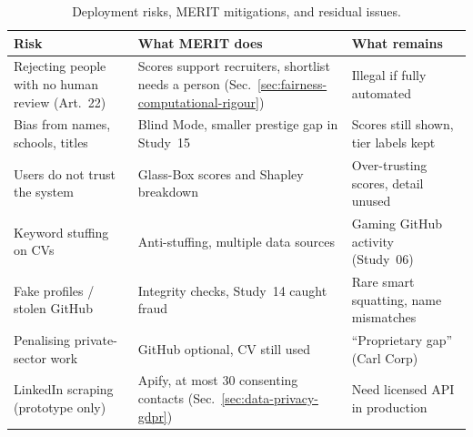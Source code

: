 \begin{table}[htbp]
    \centering
    \caption[Deployment risks and mitigations]{Deployment risks, MERIT mitigations, and residual issues.}
    \label{tab:ethics-deployment-summary}
    \merittablesize
    \begin{tabularx}{\textwidth}{@{}%
        >{\raggedright\arraybackslash\hsize=0.95\hsize}X
        >{\raggedright\arraybackslash\hsize=1.15\hsize}X
        >{\raggedright\arraybackslash\hsize=0.9\hsize}X @{}}
        \toprule
        \textbf{Risk} & \textbf{What MERIT does} &
            \textbf{What remains} \\
        \midrule
        Rejecting people with no human review (Art.~22) &
        Scores support recruiters, shortlist needs a person
            (Sec.~\ref{sec:fairness-computational-rigour}) &
        Illegal if fully automated \\
        Bias from names, schools, titles &
        Blind Mode, smaller prestige gap in Study~15 &
        Scores still shown, tier labels kept \\
        Users do not trust the system &
        Glass-Box scores and Shapley breakdown &
        Over-trusting scores, detail unused \\
        Keyword stuffing on CVs &
        Anti-stuffing, multiple data sources &
        Gaming GitHub activity (Study~06) \\
        Fake profiles / stolen GitHub &
        Integrity checks, Study~14 caught fraud &
        Rare smart squatting, name mismatches \\
        Penalising private-sector work &
        GitHub optional, CV still used &
        ``Proprietary gap'' (Carl Corp) \\
        LinkedIn scraping (prototype only) &
        Apify, at most 30 consenting contacts
            (Sec.~\ref{sec:data-privacy-gdpr}) &
        Need licensed API in production \\
        \bottomrule
    \end{tabularx}
\end{table}
